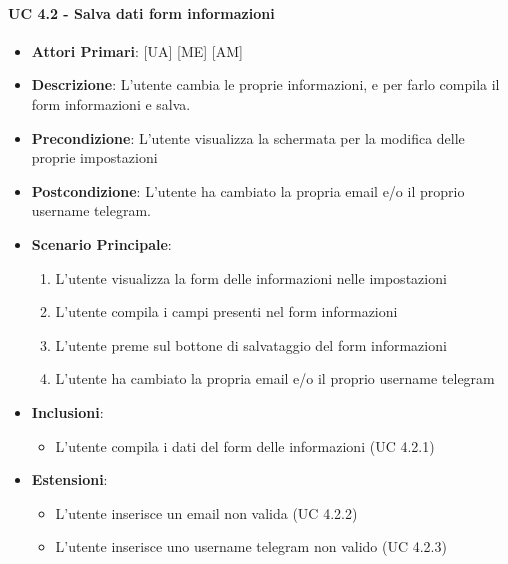 			\paragraph{UC 4.2 - Salva dati form informazioni}
			\begin{itemize}
				\item \textbf{Attori Primari}: [UA] [ME] [AM]
				\item \textbf{Descrizione}: L'utente cambia le proprie informazioni, e per farlo compila il form informazioni e salva.
				\item \textbf{Precondizione}: L'utente visualizza la schermata per la modifica delle proprie impostazioni
				\item \textbf{Postcondizione}: L'utente ha cambiato la propria email e/o il proprio username telegram.
				\item \textbf{Scenario Principale}:
				\begin{enumerate}
					\item{L'utente visualizza la form delle informazioni nelle impostazioni}
					\item{L'utente compila i campi presenti nel form informazioni}
					\item{L'utente preme sul bottone di salvataggio del form informazioni}
					\item{L'utente ha cambiato la propria email e/o il proprio username telegram}
				\end{enumerate}	
				\item \textbf{Inclusioni}:
					\begin{itemize}
						\item L'utente compila i dati del form delle informazioni (UC 4.2.1)
					\end{itemize}
				\item \textbf{Estensioni}:
					\begin{itemize}
						\item L'utente inserisce un email non valida (UC 4.2.2)
						\item L'utente inserisce uno username telegram non valido (UC 4.2.3)
					\end{itemize}
			\end{itemize}

